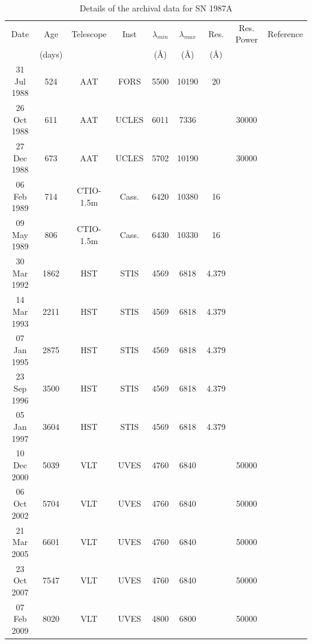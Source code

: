 \documentclass[useAMS,usenatbib,usegraphicx]{mnras}
\begin{document}
\begin{table}
	\begin{minipage}{180mm}
	\caption{Details of the archival data for SN 1987A}
	\label{tb:data}
  	\begin{tabular}{@{} ccccccccl @{}}
    	\hline
	Date & Age & Telescope  & Inst & $\lambda_{min}$ & $\lambda_{max}$ & Res. & Res. Power & Reference \\
	& (days) & & &(\AA) & (\AA)& (\AA)\\
	\hline
31 Jul 1988 & 524 & AAT & FORS & 5500 & 10190 & 20 & & \citet{Spyromilio1991} \\
26 Oct 1988 & 611 & AAT & UCLES & 6011 & 7336 &  & 30000 & \citet{Hanuschik1993, Spyromilio1993a}\\
27 Dec 1988 & 673 & AAT & UCLES & 5702 & 10190 &  & 30000 & \citet{Hanuschik1993, Spyromilio1993a}\\
06 Feb 1989 & 714 & CTIO-1.5m & Cass. & 6420 & 10380 & 16 & & \citet{Phillips1990}\\
09 May 1989 & 806 & CTIO-1.5m & Cass. & 6430 & 10330 & 16 & & \citet{Phillips1990}\\
30 Mar 1992 & 1862 & HST & STIS & 4569 & 6818 & 4.379 &  & \citet{Wang1996}\\
14 Mar 1993 & 2211 & HST & STIS & 4569 & 6818 & 4.379 &  & \citet{Wang1996}\\
07 Jan 1995 & 2875 & HST & STIS & 4569 & 6818 & 4.379 &  & \citet{Chugai1997}\\
23 Sep 1996 & 3500 & HST & STIS & 4569 & 6818 & 4.379 &  \\
05 Jan 1997 & 3604 & HST & STIS & 4569 & 6818 & 4.379 &  \\
10 Dec 2000 & 5039 & VLT & UVES & 4760 & 6840 &  & 50000 & \citet{Groeningsson2006, Groeningsson2007}\\
06 Oct 2002 & 5704 & VLT & UVES & 4760 & 6840 &  & 50000 & \citet{Groeningsson2006, Groeningsson2007, Groningsson2008}\\
21 Mar 2005 & 6601 & VLT & UVES & 4760 & 6840 &  & 50000 &\citet{Groeningsson2006, Groeningsson2007}\\
23 Oct 2007 & 7547 & VLT & UVES & 4760 & 6840 &  & 50000 & \citet{Groeningsson2007}\\
07 Feb 2009 & 8020 & VLT & UVES & 4800 & 6800 &  & 50000 & \citet{Tziamtzis2010}\\
    \hline
  \end{tabular}
\end{minipage}
\end{table}
\end{document}
